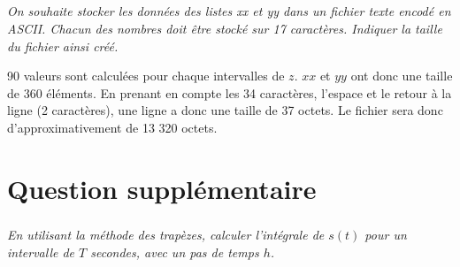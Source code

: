 \documentclass[10pt,fleqn]{article} %
\begin{document}
%

\fi

\subparagraph{}
\textit{On souhaite stocker les données des listes \textsf{xx} et \textsf{yy} dans un fichier texte encodé en ASCII. Chacun des nombres doit être stocké sur 17 caractères. Indiquer la taille du fichier ainsi créé.}
\ifprof
\begin{corrige}
90 valeurs sont calculées pour chaque intervalles de $z$. $xx$ et $yy$ ont donc une taille de 360 éléments. 
En prenant en compte les 34 caractères, l'espace et le retour à la ligne (2 caractères), une ligne a donc une taille de 37 octets. Le fichier sera donc d'approximativement de 13 320 octets.
\end{corrige}
\else


\fi
\ifprof
\else
%
%
%
\fi

\section*{Question supplémentaire}

\subparagraph{}
\textit{En utilisant la méthode des trapèzes, calculer l'intégrale de $s(t)$ pour un intervalle de $T$ secondes, avec un pas de temps $h$.}
\end{document}
